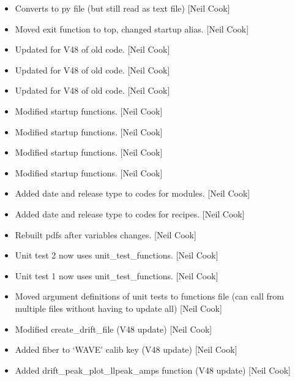 \documentclass[a4paper,10pt,english]{report}
\begin{document}
\begin{itemize}
\item {} 
Converts to py file (but still read as text file) {[}Neil Cook{]}

\item {} 
Moved exit function to top, changed startup alias. {[}Neil Cook{]}

\item {} 
Updated for V48 of old code. {[}Neil Cook{]}

\item {} 
Updated for V48 of old code. {[}Neil Cook{]}

\item {} 
Updated for V48 of old code. {[}Neil Cook{]}

\item {} 
Modified startup functions. {[}Neil Cook{]}

\item {} 
Modified startup functions. {[}Neil Cook{]}

\item {} 
Modified startup functions. {[}Neil Cook{]}

\item {} 
Modified startup functions. {[}Neil Cook{]}

\item {} 
Added date and release type to codes for modules. {[}Neil Cook{]}

\item {} 
Added date and release type to codes for recipes. {[}Neil Cook{]}

\item {} 
Rebuilt pdfs after variables changes. {[}Neil Cook{]}

\item {} 
Unit test 2 now uses unit\_test\_functions. {[}Neil Cook{]}

\item {} 
Unit test 1 now uses unit\_test\_functions. {[}Neil Cook{]}

\item {} 
Moved argument definitions of unit tests to functions file (can call
from multiple files without having to update all) {[}Neil Cook{]}

\item {} 
Modified create\_drift\_file (V48 update) {[}Neil Cook{]}

\item {} 
Added fiber to ‘WAVE’ calib key (V48 update) {[}Neil Cook{]}

\item {} 
Added drift\_peak\_plot\_llpeak\_amps function (V48 update) {[}Neil Cook{]}


\end{itemize}
\end{document}
